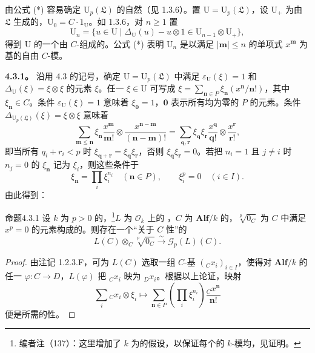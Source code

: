 由公式 (*) 容易确定 $\mathrm U_p(\mathfrak L)$ 的自然（见 1.3.6）。置 $\mathrm U=\mathrm U_p(\mathfrak L)$，设 $\mathrm U_+$ 为由 $\mathfrak L$ 生成的，$\mathrm U_0=C\cdot1_{\mathrm U}$。如 1.3.6，对 $n\geq1$ 置
\[
\mathrm U_n=\{u\in\mathrm U\mid\Delta_{\mathrm U}(u)-u\otimes1\in\mathrm U_{n-1}\otimes\mathrm U_+\},
\]
得到 $\mathrm U$ 的一个由 $C$-组成的。公式 (*) 表明 $\mathrm U_n$ 是以满足 $|\mathbf m|\leq n$ 的单项式 $x^{\mathbf m}$ 为基的自由 $C$-模。

\textbf{4.3.1。} 沿用 4.3 的记号，确定 $\mathrm U=\mathrm U_p(\mathfrak L)$ 中满足 $\varepsilon_{\mathrm U}(\xi)=1$ 和 $\Delta_{\mathrm U}(\xi)=\xi\otimes\xi$ 的元素 $\xi$。任一 $\xi\in\mathrm U$ 可写成 $\xi=\sum_{\mathbf n\in P}\xi_{\mathbf n}(x^{\mathbf n}/\mathbf n!)$，其中 $\xi_{\mathbf n}\in C$。条件 $\varepsilon_{\mathrm U}(\xi)=1$ 意味着 $\xi_{\mathbf0}=1$，$\mathbf0$ 表示所有均为零的 $P$ 的元素。条件 $\Delta_{\mathrm U_p(\mathfrak L)}(\xi)=\xi\otimes\xi$ 意味着
\[
\sum_{\mathbf m\leq\mathbf n}\xi_{\mathbf n}\frac{x^{\mathbf m}}{\mathbf m!}\otimes
\frac{x^{\mathbf n-\mathbf m}}{(\mathbf n-\mathbf m)!}
=\sum_{\mathbf q,\mathbf r}\xi_{\mathbf q}\xi_{\mathbf r}
\frac{x^{\mathbf q}}{\mathbf q!}\otimes\frac{x^{\mathbf r}}{\mathbf r!},
\]
即当所有 $q_i+r_i<p$ 时 $\xi_{\mathbf q+\mathbf r}=\xi_{\mathbf q}\xi_{\mathbf r}$，否则 $\xi_{\mathbf q}\xi_{\mathbf r}=0$。若把 $n_i=1$ 且 $j\ne i$ 时 $n_j=0$ 的 $\xi_{\mathbf n}$ 记为 $\xi_i$，则这些条件于
\[
\xi_{\mathbf n}=\prod_i\xi_i^{n_i}\quad(\mathbf n\in P),\qquad \xi_i^p=0\quad(i\in I).
\]
由此得到：
\begin{SGAresult}{命题}{4.3.1}
设 $k$ 为 $p>0$ 的，\footnote{编者注（137）：这里增加了 $k$ 为的假设，以保证每个的 $k$-模均，见证明。}$L$ 为 $\mathcal O_k$ 上的 ，$C$ 为 $\mathbf{Alf}/k$ 的，$\sqrt[p]{0_C}$ 为 $C$ 中满足 $x^p=0$ 的元素构成的。则存在一个“关于 $C$ 性”的
\[L(C)\otimes_C\sqrt[p]{0_C}\xrightarrow{\sim}\mathscr G_p(L)(C).\]
\end{SGAresult}
\begin{proof}
由注记 1.2.3.F，可为 $L(C)$ 选取一组 $C$-基 $({}_Cx_i)_{i\in I}$，使得对 $\mathbf{Alf}/k$ 的任一 $\varphi:C\to D$，$L(\varphi)$ 把 ${}_Cx_i$ 映为 ${}_Dx_i$。根据以上论证，映射
\[
\sum_i{}_Cx_i\otimes\xi_i\longmapsto
\sum_{\mathbf n\in P}\left(\prod_i\xi_i^{n_i}\right)\frac{{}_Cx^{\mathbf n}}{\mathbf n!}
\]
便是所需的性。
\end{proof}

